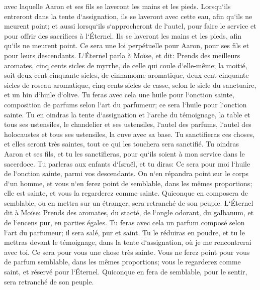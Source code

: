 \verse avec laquelle Aaron et ses fils se laveront les mains et les pieds. 
\verse Lorsqu`ils entreront dans la tente d`assignation, ils se laveront avec cette eau, afin qu`ils ne meurent point; et aussi lorsqu`ils s`approcheront de l`autel, pour faire le service et pour offrir des sacrifices à l`Éternel. 
\verse Ils se laveront les mains et les pieds, afin qu`ils ne meurent point. Ce sera une loi perpétuelle pour Aaron, pour ses fils et pour leurs descendants. 
\verse L`Éternel parla à Moïse, et dit: 
\verse Prends des meilleurs aromates, cinq cents sicles de myrrhe, de celle qui coule d`elle-même; la moitié, soit deux cent cinquante sicles, de cinnamome aromatique, deux cent cinquante sicles de roseau aromatique, 
\verse cinq cents sicles de casse, selon le sicle du sanctuaire, et un hin d`huile d`olive. 
\verse Tu feras avec cela une huile pour l`onction sainte, composition de parfums selon l`art du parfumeur; ce sera l`huile pour l`onction sainte. 
\verse Tu en oindras la tente d`assignation et l`arche du témoignage, 
\verse la table et tous ses ustensiles, le chandelier et ses ustensiles, l`autel des parfums, 
\verse l`autel des holocaustes et tous ses ustensiles, la cuve avec sa base. 
\verse Tu sanctifieras ces choses, et elles seront très saintes, tout ce qui les touchera sera sanctifié. 
\verse Tu oindras Aaron et ses fils, et tu les sanctifieras, pour qu`ils soient à mon service dans le sacerdoce. 
\verse Tu parleras aux enfants d`Israël, et tu diras: Ce sera pour moi l`huile de l`onction sainte, parmi vos descendants. 
\verse On n`en répandra point sur le corps d`un homme, et vous n`en ferez point de semblable, dans les mêmes proportions; elle est sainte, et vous la regarderez comme sainte. 
\verse Quiconque en composera de semblable, ou en mettra sur un étranger, sera retranché de son peuple. 
\verse L`Éternel dit à Moïse: Prends des aromates, du stacté, de l`ongle odorant, du galbanum, et de l`encens pur, en parties égales. 
\verse Tu feras avec cela un parfum composé selon l`art du parfumeur; il sera salé, pur et saint. 
\verse Tu le réduiras en poudre, et tu le mettras devant le témoignage, dans la tente d`assignation, où je me rencontrerai avec toi. Ce sera pour vous une chose très sainte. 
\verse Vous ne ferez point pour vous de parfum semblable, dans les mêmes proportions; vous le regarderez comme saint, et réservé pour l`Éternel. 
\verse Quiconque en fera de semblable, pour le sentir, sera retranché de son peuple. 

\chapter{}

